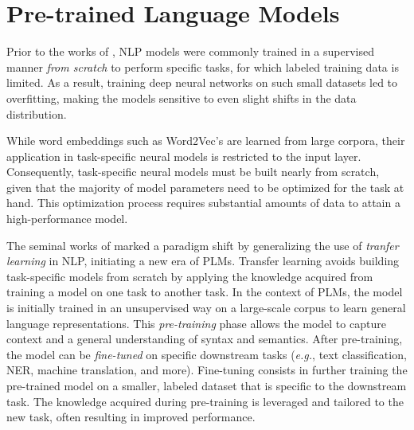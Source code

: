 
\section{Pre-trained Language Models}
\label{sec:chapter2-plms}

Prior to the works of \citet{peters-etal-2018-deep}, \ac{NLP} models were commonly trained in a supervised manner \textit{from scratch} to perform specific tasks, for which labeled training data is limited. As a result, training deep neural networks on such small datasets led to overfitting, making the models sensitive to even slight shifts in the data distribution. 

While word embeddings such as Word2Vec's \citep{mikolov2013efficient} are learned from large corpora, their application in task-specific neural models is restricted to the input layer. Consequently, task-specific neural models must be built nearly from scratch, given that the majority of model parameters need to be optimized for the task at hand. This optimization process requires substantial amounts of data to attain a high-performance model.

The seminal works of \citet{peters-etal-2018-deep, devlin2018bert, radford2018improving} marked a paradigm shift by generalizing the use of \textit{tranfer learning} in \ac{NLP}, initiating a new era of \acp{PLM}. Transfer learning avoids building task-specific models from scratch by applying the knowledge acquired from training a model on one task to another task. In the context of \acp{PLM}, the model is initially trained in an unsupervised way on a large-scale corpus to learn general language representations. This \textit{pre-training} phase allows the model to capture context and a general understanding of syntax and semantics. After pre-training, the model can be \textit{fine-tuned} on specific downstream tasks (\textit{e.g.}, text classification, \ac{NER}, machine translation, and more). Fine-tuning consists in further training the pre-trained model on a smaller, labeled dataset that is specific to the downstream task. The knowledge acquired during pre-training is leveraged and tailored to the new task, often resulting in improved performance.


